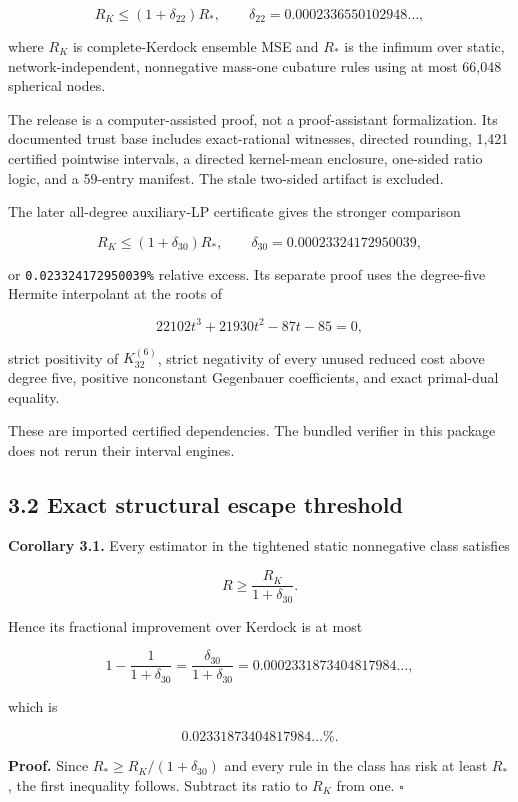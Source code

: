 \documentclass[
  10pt,
]{article}
\begin{document}
\[
R_K\le (1+\delta_{22})R_*,
\qquad
\delta_{22}=0.0002336550102948\ldots,
\]

where \(R_K\) is complete-Kerdock ensemble MSE and \(R_*\) is the
infimum over static, network-independent, nonnegative mass-one cubature
rules using at most 66,048 spherical nodes.

The release is a computer-assisted proof, not a proof-assistant
formalization. Its documented trust base includes exact-rational
witnesses, directed rounding, 1,421 certified pointwise intervals, a
directed kernel-mean enclosure, one-sided ratio logic, and a 59-entry
manifest. The stale two-sided artifact is excluded.

The later all-degree auxiliary-LP certificate gives the stronger
comparison

\[
R_K\le (1+\delta_{30})R_*,
\qquad
\delta_{30}=0.00023324172950039,
\]

or \texttt{0.023324172950039\%} relative excess. Its separate proof uses
the degree-five Hermite interpolant at the roots of

\[
22102t^3+21930t^2-87t-85=0,
\]

strict positivity of \(K_{32}^{(6)}\), strict negativity of every unused
reduced cost above degree five, positive nonconstant Gegenbauer
coefficients, and exact primal-dual equality.

These are imported certified dependencies. The bundled verifier in this
package does not rerun their interval engines.

\subsection{3.2 Exact structural escape
threshold}\label{exact-structural-escape-threshold}

\textbf{Corollary 3.1.} Every estimator in the tightened static
nonnegative class satisfies

\[
R\ge \frac{R_K}{1+\delta_{30}}.
\]

Hence its fractional improvement over Kerdock is at most

\[
1-\frac1{1+\delta_{30}}
=
\frac{\delta_{30}}{1+\delta_{30}}
=
0.0002331873404817984\ldots,
\]

which is

\[
0.02331873404817984\ldots\%.
\]

\textbf{Proof.} Since \(R_*\ge R_K/(1+\delta_{30})\) and every rule in
the class has risk at least \(R_*\), the first inequality follows.
Subtract its ratio to \(R_K\) from one. \(\square\)
\end{document}
